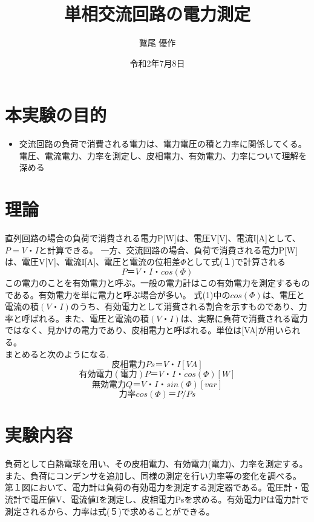 \documentclass[titlepage]{jarticle}
\title{単相交流回路の電力測定}
\author{鷲尾 優作}
\date{令和2年7月8日}
\begin{document}
\maketitle

\section{本実験の目的}
\begin{itemize}
    \item 交流回路の負荷で消費される電力は、電力電圧の積と力率に関係してくる。電圧、電流電力、力率を測定し、皮相電力、有効電力、力率について理解を深める
\end{itemize}

\section{理論}
直列回路の場合の負荷で消費される電力P[W]は、電圧V[V]、電流I[A]として、$P=V・I$と計算できる。
一方、交流回路の場合、負荷で消費される電力P[W]は、電圧V[V]、電流I[A]、電圧と電流の位相差$Φ$として式(１)で計算される\\

\begin{equation}
    P＝V・I・cos(Φ)
\end{equation}
この電力のことを有効電力と呼ぶ。一般の電力計はこの有効電力を測定するものである。有効電力を単に電力と呼ぶ場合が多い。
式(1)中の$cos(Φ)$は、電圧と電流の積$(V・I)$のうち、有効電力として消費される割合を示すものであり、力率と呼ばれる。また、電圧と電流の積$(V・I)$は、実際に負荷で消費される電力ではなく、見かけの電力であり、皮相電力と呼ばれる。単位は[VA]が用いられる。\\
まとめると次のようになる.\\
\begin{equation}
    皮相電力	 Ps＝V・I	        [VA]
\end{equation}
\begin{equation}
    有効電力(電力)　  P＝V・I・cos(Φ)　　　[W]
\end{equation}
\begin{equation}
    無効電力　　　　 Q＝V・I・sin(Φ)　　　 [var]
\end{equation}
\begin{equation}
    力率		 cos(Φ)＝P/Ps
\end{equation}

\section{実験内容}
負荷として白熱電球を用い、その皮相電力、有効電力(電力)、力率を測定する。また、負荷にコンデンサを追加し、同様の測定を行い力率等の変化を調べる。
第１図において、電力計は負荷の有効電力を測定する測定器である。電圧計・電流計で電圧値V、電流値Iを測定し、皮相電力Psを求める。有効電力Pは電力計で測定されるから、力率は式(５)で求めることができる。
\end{document}
